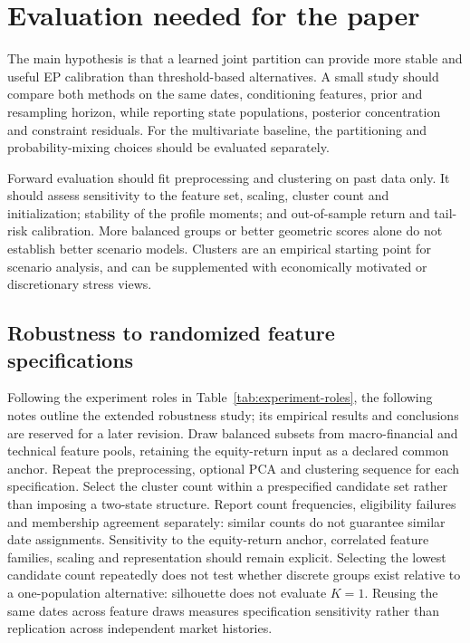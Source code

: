 \documentclass[11pt,a4paper]{article}
\begin{document}
\section{Evaluation needed for the paper}
\label{sec:evaluation}

The main hypothesis is that a learned joint partition can provide more stable and useful EP calibration than threshold-based alternatives. A small study should compare both methods on the same dates, conditioning features, prior and resampling horizon, while reporting state populations, posterior concentration and constraint residuals. For the multivariate baseline, the partitioning and probability-mixing choices should be evaluated separately.

Forward evaluation should fit preprocessing and clustering on past data only. It should assess sensitivity to the feature set, scaling, cluster count and initialization; stability of the profile moments; and out-of-sample return and tail-risk calibration. More balanced groups or better geometric scores alone do not establish better scenario models. Clusters are an empirical starting point for scenario analysis, and can be supplemented with economically motivated or discretionary stress views.

\subsection{Robustness to randomized feature specifications}

Following the experiment roles in Table~\ref{tab:experiment-roles}, the following notes outline the extended robustness study; its empirical results and conclusions are reserved for a later revision. Draw balanced subsets from macro-financial and technical feature pools, retaining the equity-return input as a declared common anchor. Repeat the preprocessing, optional PCA and clustering sequence for each specification. Select the cluster count within a prespecified candidate set rather than imposing a two-state structure. Report count frequencies, eligibility failures and membership agreement separately: similar counts do not guarantee similar date assignments. Sensitivity to the equity-return anchor, correlated feature families, scaling and representation should remain explicit. Selecting the lowest candidate count repeatedly does not test whether discrete groups exist relative to a one-population alternative: silhouette does not evaluate $K=1$. Reusing the same dates across feature draws measures specification sensitivity rather than replication across independent market histories.
\end{document}
